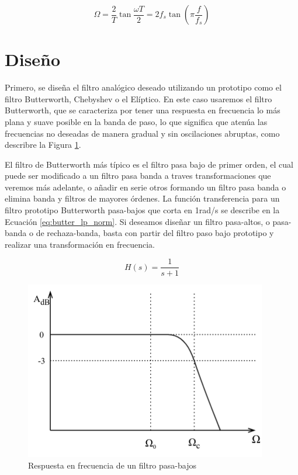 \begin{equation}
  \Omega = \frac{2}{T} \tan \frac{\omega T}{2} = 2 f_s \tan\left(\pi \frac{f}{f_s}\right)
  \label{eq:relacion_tangencial_frec_ang}
\end{equation}


\section{Diseño}
Primero, se diseña el filtro analógico deseado utilizando un prototipo como el filtro Butterworth, Chebyshev o el Elíptico. En este caso usaremos el filtro Butterworth, que se caracteriza por tener una respuesta en frecuencia lo más plana y suave posible en la banda de paso, lo que significa que atenúa las frecuencias no deseadas de manera gradual y sin oscilaciones abruptas, como describre la Figura \ref{fig:diagrama_bode_pasa_bajos}.

El filtro de Butterworth más típico es el filtro pasa bajo de primer orden, el cual puede ser modificado a un filtro pasa banda a traves transformaciones que veremos más adelante, o añadir en serie otros formando un filtro pasa banda o elimina banda y filtros de mayores órdenes. La función transferencia para un filtro prototipo Butterworth pasa-bajos que corta en 1rad/s se describe en la Ecuación \ref{eq:butter_lp_norm}. Si deseamos diseñar un filtro pasa-altos, o pasa-banda o de rechaza-banda, basta con partir del filtro paso bajo prototipo y realizar una transformación en frecuencia.

\begin{equation}
  H(s) = \frac{1}{s+1}
  \label{eq:butter_lp_norm}
\end{equation}

\begin{figure}[H]
  \centering
  \includegraphics[width=300pt]{images/diagramas-bode-filtro-lp.png}
  \caption{Respuesta en frecuencia de un filtro pasa-bajos}
  \label{fig:diagrama_bode_pasa_bajos}
\end{figure}

